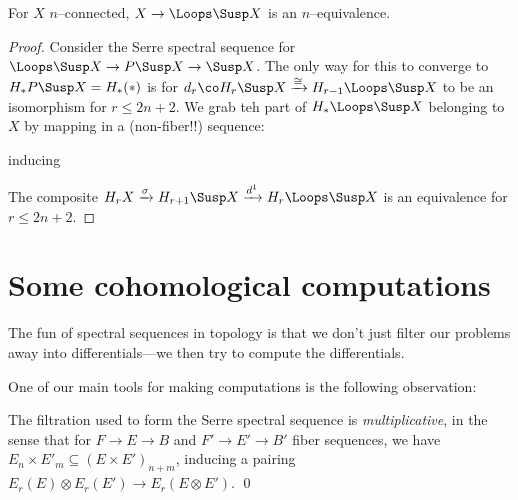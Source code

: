 \begin{theorem}[Freudenthal]
For $X$ $n$--connected, $X \to \Loops \Susp X$ is an $n$--equivalence.
\end{theorem}
\begin{proof}
Consider the Serre spectral sequence for $\Loops \Susp X \to P \Susp X \to \Susp X$.
The only way for this to converge to $H_* P \Susp X = H_*(*)$ is for $d_r\co H_r \Susp X \xrightarrow\cong H_{r-1} \Loops \Susp X$ to be an isomorphism for $r \le 2n+2$.  We grab teh part of $H_* \Loops \Susp X$ belonging to $X$ by mapping in a (non-fiber!!) sequence:
\begin{center}
\end{center}
inducing
\begin{center}
\end{center}
The composite $H_r X \xrightarrow\sigma H_{r+1} \Susp X \xrightarrow{d^1} H_r \Loops \Susp X$ is an equivalence for $r \le 2n+2$.
\end{proof}




\section{Some cohomological computations}

The fun of spectral sequences in topology is that we don't just filter our problems away into differentials---we then try to compute the differentials.

One of our main tools for making computations is the following observation:
\begin{lemma}
The filtration used to form the Serre spectral sequence is \emph{multiplicative}, in the sense that for $F \to E \to B$ and $F' \to E' \to B'$ fiber sequences, we have $E_n \times E'_m \subseteq (E \times E')_{n+m}$, inducing a pairing $E_r(E) \otimes E_r(E') \to E_r(E \otimes E')$. \qed
\end{lemma}

